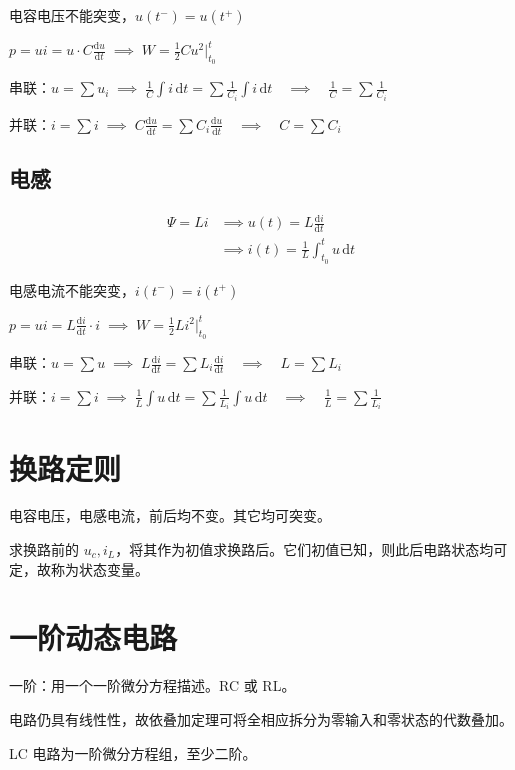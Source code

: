 \documentclass[12pt, a4paper, UTF8, openany]{ctexbook}
\newcommand{\dif}{\mathrm{d}}
\newcommand{\dift}{\,\dif t}
\begin{document}
        {\heiti 电容电压}不能突变，$u(t^-) = u(t^+)$

        $p = ui = u \cdot C \frac{\dif u}{\dif t} \; \implies \; W = \frac{1}{2} Cu^2|_{t_0}^{t}$

        串联：$u = \sum u_i \; \implies \; \frac{1}{C} \int i \dift = \sum \frac{1}{C_i} \int i \dift \quad \implies \quad \frac{1}{C} = \sum\frac{1}{C_i}$

        并联：$i = \sum i \; \implies \; C \frac{\dif u}{\dif t} = \sum C_i \frac{\dif u}{\dif t} \quad \implies \quad C = \sum C_i$

        \subsection{电感}
        $$\begin{aligned}
            \Psi = Li & \implies \boxed{u(t) = L \frac{\dif i}{\dif t}} \\
            & \implies i(t) = \frac{1}{L} \int_{t_0}^{t} u \dift
        \end{aligned}$$

        {\heiti 电感电流}不能突变，$i(t^-) = i(t^+)$

        $p = ui = L \frac{\dif i}{\dif t} \cdot i \; \implies \; W = \frac{1}{2} Li^2|_{t_0}^{t}$

        串联：$u = \sum u \; \implies \; L \frac{\dif i}{\dif t} = \sum L_i \frac{\dif i}{\dif t} \quad \implies \quad L = \sum L_i$

        并联：$i = \sum i \; \implies \; \frac{1}{L} \int u \dift = \sum \frac{1}{L_i} \int u \dift \quad \implies \quad \frac{1}{L} = \sum\frac{1}{L_i}$

    \section{换路定则}
    电容电压，电感电流，前后均不变。其它均可突变。

    求换路前的 $u_c, i_L$，将其作为初值求换路后。它们初值已知，则此后电路状态均可定，故称为状态变量。

    \section{一阶动态电路}
    一阶：用一个一阶微分方程描述。RC 或 RL。

    电路仍具有线性性，故依叠加定理可将全相应拆分为零输入和零状态的代数叠加。

    LC 电路为一阶微分方程组，至少二阶。
\end{document}

